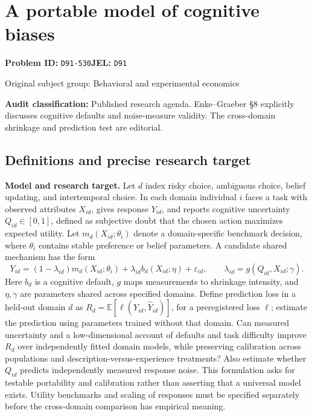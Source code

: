 \documentclass[11pt,a4paper]{article}
\begin{document}
\section*{A portable model of cognitive biases}
\textbf{Problem ID:} \texttt{D91-530}\quad \textbf{JEL:} \texttt{D91}\par
\label{problem:OP-0301}
{\sffamily\small\color{muted}Original subject group: Behavioral and experimental economics\par}
\label{definitions:problem:30007583}
\textbf{Audit classification:} Published research agenda. Enke–Graeber §8 explicitly discusses cognitive defaults and noise-measure validity. The cross-domain shrinkage and prediction test are editorial.
\subsection*{Definitions and precise research target}
\textbf{Model and research target.} Let \(d\) index risky choice, ambiguous choice, belief updating, and intertemporal choice. In each domain individual \(i\) faces a task with observed attributes \(X_{id}\), gives response \(Y_{id}\), and reports cognitive uncertainty \(Q_{id}\in[0,1]\), defined as subjective doubt that the chosen action maximizes expected utility. Let \(m_d(X_{id};\theta_i)\) denote a domain-specific benchmark decision, where \(\theta_i\) contains stable preference or belief parameters. A candidate shared mechanism has the form
\[Y_{id}=(1-\lambda_{id})m_d(X_{id};\theta_i)+\lambda_{id}b_d(X_{id};\eta)+\varepsilon_{id},\qquad \lambda_{id}=g(Q_{id},X_{id};\gamma).\]
Here \(b_d\) is a cognitive default, \(g\) maps measurements to shrinkage intensity, and \(\eta,\gamma\) are parameters shared across specified domains. Define prediction loss in a held-out domain \(d\) as \(R_d=\mathbb E[\ell(Y_{id},\widehat Y_{id})]\), for a preregistered loss \(\ell\); estimate the prediction using parameters trained without that domain. Can measured uncertainty and a low-dimensional account of defaults and task difficulty improve \(R_d\) over independently fitted domain models, while preserving calibration across populations and description-versus-experience treatments? Also estimate whether \(Q_{id}\) predicts independently measured response noise. This formulation asks for testable portability and calibration rather than asserting that a universal model exists. Utility benchmarks and scaling of responses must be specified separately before the cross-domain comparison has empirical meaning.
\end{document}
